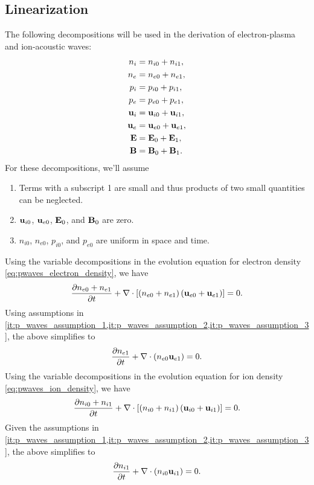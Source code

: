 \documentclass[a4paper,11pt]{report}
\begin{document}
\subsection{Linearization}
\label{sec:p_waves_linearization}
The following decompositions will be used in the derivation of electron-plasma and ion-acoustic waves:
\begin{align}
    n_i &= n_{i0} + n_{i1}, \nonumber \\
    n_e &= n_{e0} + n_{e1}, \nonumber \\
    p_i &= p_{i0} + p_{i1}, \nonumber \\
    p_e &= p_{e0} + p_{e1}, \nonumber \\
    \mathbf{u}_i &= \mathbf{u}_{i0} + \mathbf{u}_{i1}, \nonumber \\
    \mathbf{u}_e &= \mathbf{u}_{e0} + \mathbf{u}_{e1}, \nonumber \\
    \mathbf{E} &= \mathbf{E}_0 + \mathbf{E}_1, \nonumber \\
    \mathbf{B} &= \mathbf{B}_0 + \mathbf{B}_1.
\end{align}
For these decompositions, we'll assume
\begin{enumerate}
    \item Terms with a subscript 1 are small and thus products of two small quantities can be neglected. \label{it:p_waves_assumption_1}
    \item $\mathbf{u}_{i0}$, $\mathbf{u}_{e0}$, $\mathbf{E}_0$, and $\mathbf{B}_0$ are zero. \label{it:p_waves_assumption_2}
    \item $n_{i0}$, $n_{e0}$, $p_{i0}$, and $p_{e0}$ are uniform in space and time. \label{it:p_waves_assumption_3}
\end{enumerate}

Using the variable decompositions in the evolution equation for electron density \cref{eq:pwaves_electron_density}, we have
\begin{equation*}
    \frac{\partial n_{e0} + n_{e1}}{\partial t} + \nabla \cdot \left [ \left ( n_{e0} + n_{e1} \right )  \left ( \mathbf{u}_{e0} + \mathbf{u}_{e1} \right ) \right ] = 0.
\end{equation*}
Using assumptions in \cref{it:p_waves_assumption_1,it:p_waves_assumption_2,it:p_waves_assumption_3}, the above simplifies to
\begin{equation}
    \label{eq:p_waves_e_den_linearized}
    \frac{\partial n_{e1}}{\partial t} + \nabla \cdot \left (n_{e0} \mathbf{u}_{e1} \right ) = 0.
\end{equation}
Using the variable decompositions in the evolution equation for ion density \cref{eq:pwaves_ion_density}, we have
\begin{equation*}
    \frac{\partial n_{i0} + n_{i1}}{\partial t} + \nabla \cdot \left [ \left ( n_{i0} + n_{i1} \right )  \left ( \mathbf{u}_{i0} + \mathbf{u}_{i1} \right ) \right ] = 0.
\end{equation*}
Given the assumptions in \cref{it:p_waves_assumption_1,it:p_waves_assumption_2,it:p_waves_assumption_3}, the above simplifies to
\begin{equation}
    \label{eq:p_waves_i_den_linearized}
    \frac{\partial n_{i1}}{\partial t} + \nabla \cdot \left (n_{i0} \mathbf{u}_{i1} \right ) = 0.
\end{equation}
\end{document}
